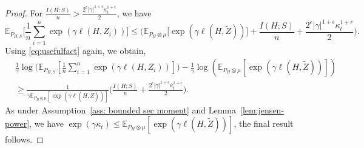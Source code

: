 \documentclass{article}
\theoremstyle{plain}
\theoremstyle{plain}
\theoremstyle{definition}
\theoremstyle{remark}
\newcommand{\mbE}{\mathbb{E}}
\begin{document}
\begin{proof}
    For $\frac{I(H;S)}{n}> \frac{2^{\epsilon}|\gamma|^{1+\epsilon} \kappa_t^{1+\epsilon}}{2}$, we have 
    \begin{equation}\label{eq: vu122}
\mbE_{P_{H,S}}\Big[\frac{1}{n}\sum_{i=1}^n \exp(\gamma \ell(H,Z_i))\Big]
        \leq \Big(\mbE_{P_{H}\otimes \mu}\Big[ \exp(\gamma \ell(H,\tilde Z))\Big]+  \frac{ I(H;S)}{n}+\frac{2^{\epsilon}|\gamma|^{1+\epsilon} \kappa_t^{1+\epsilon}}{2}\Big).
    \end{equation}
    Using \eqref{eq:usefulfact} again,  we obtain,
    \begin{equation}\label{eq: vu1222}
    \begin{split}
        &\frac{1}{\gamma}\log\Big(\mbE_{P_{H,S}}[\frac{1}{n}\sum_{i=1}^n \exp(\gamma \ell(H,Z_i))]\Big)-\frac{1}{\gamma}\log(\mbE_{P_{H}\otimes \mu}[ \exp(\gamma \ell(H,\tilde Z))])\\
        &\geq  \frac{1}{\gamma \mbE_{P_{H}\otimes \mu}[ \exp(\gamma \ell(H,\tilde Z))]} \Big(\frac{ I(H;S)}{n}+\frac{2^{\epsilon}|\gamma|^{1+\epsilon} \kappa_t^{1+\epsilon}}{2}\Big).
    \end{split}
    \end{equation}
   As under Assumption~\ref{ass: bounded sec moment} and Lemma~\ref{lem:jensen-power}, we have $\exp(\gamma \kappa_t)\leq\mbE_{P_{H}\otimes \mu}[ \exp(\gamma \ell(H,\tilde Z))]$, the final result follows.
\end{proof}
\end{document}
